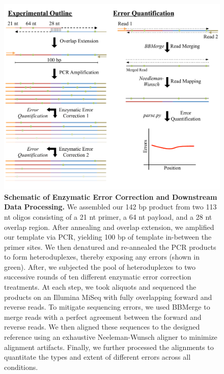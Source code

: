 \documentclass[twocolumn]{article}
\begin{document}


%

\clearpage
\begin{figure}[t]
\centering
\includegraphics[width=174mm]{Figure_1.pdf}
    \caption{\small \textbf{Schematic of Enzymatic Error Correction and Downstream Data Processing.} We assembled our 142 bp product from two 113 nt oligos consisting of a 21 nt primer, a 64 nt payload, and a 28 nt overlap region. After annealing and overlap extension, we amplified our template via PCR, yielding 100 bp of template in-between the primer sites. We then denatured and re-annealed the PCR products to form heteroduplexes, thereby exposing any errors (shown in green). After, we subjected the pool of heteroduplexes to two successive rounds of ten different enzymatic error correction treatments. At each step, we took aliquots and sequenced the products on an Illumina MiSeq with fully overlapping forward and reverse reads. To mitigate sequencing errors, we used BBMerge to merge reads with a perfect agreement between the forward and reverse reads. We then aligned these sequences to the designed reference using an exhaustive Neeleman-Wunsch aligner to minimize alignment artifacts. Finally, we further processed the alignments to quantitate the types and extent of different errors across all conditions.}
\label{fig:intro}
\end{figure}

\end{document}
